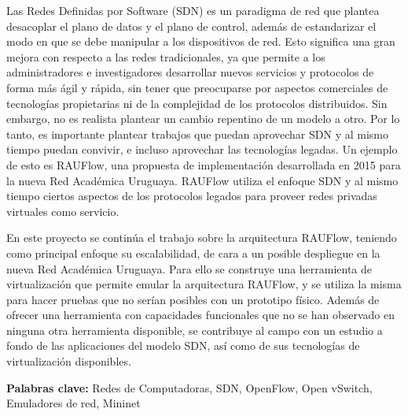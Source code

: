 \begin{abstract2}
Las Redes Definidas por Software (SDN) es un paradigma de red que plantea desacoplar el plano de datos y el plano de control, además de estandarizar el modo en que se debe manipular a los dispositivos de red. Esto significa una gran mejora con respecto a las redes tradicionales, ya que permite a los administradores e investigadores desarrollar nuevos servicios y protocolos de forma más ágil y rápida, sin tener que preocuparse por aspectos comerciales de tecnologías propietarias ni de la complejidad de los protocolos distribuidos. Sin embargo, no es realista plantear un cambio repentino de un modelo a otro. Por lo tanto, es importante plantear trabajos que puedan aprovechar SDN y al mismo tiempo puedan convivir, e incluso aprovechar las tecnologías legadas. Un ejemplo de esto es RAUFlow, una propuesta de implementación desarrollada en 2015 para la nueva Red Académica Uruguaya. RAUFlow utiliza el enfoque SDN y al mismo tiempo ciertos aspectos de los protocolos legados para proveer redes privadas virtuales como servicio.

En este proyecto se continúa el trabajo sobre la arquitectura RAUFlow, teniendo como principal enfoque su escalabilidad, de cara a un posible despliegue en la nueva Red Académica Uruguaya. Para ello se construye una herramienta de virtualización que permite emular la arquitectura RAUFlow, y se utiliza la misma para hacer pruebas que no serían posibles con un prototipo físico. Además de ofrecer una herramienta con capacidades funcionales que no se han observado en ninguna otra herramienta disponible, se contribuye al campo con un estudio a fondo de las aplicaciones del modelo SDN, así como de sus tecnologías de virtualización disponibles.

\textbf{Palabras clave:} Redes de Computadoras, SDN, OpenFlow, Open vSwitch, Emuladores de red, Mininet
\end{abstract2}
